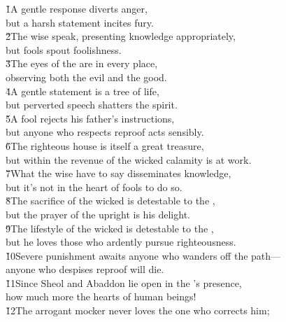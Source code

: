 \begin{poetry}
\poeml {}
\v{1}A gentle response diverts anger, \\
\poeml but a harsh statement incites fury. \\
\poeml \v{2}The wise speak, presenting knowledge appropriately, \\
\poemll    but fools spout foolishness. \\
\poeml \v{3}The eyes of the  are in every place, \\
\poemll    observing both the evil and the good. \\
\poeml \v{4}A gentle statement is a tree of life, \\
\poemll    but perverted speech shatters the spirit. \\
\poeml \v{5}A fool rejects his father's instructions, \\
\poemll    but anyone who respects reproof acts sensibly. \\
\poeml \v{6}The righteous house is itself a great treasure, \\
\poemll    but within the revenue of the wicked calamity is at work. \\
\poeml \v{7}What the wise have to say disseminates knowledge, \\
\poemll    but it's not in the heart of fools to do so. \\
\poeml \v{8}The sacrifice of the wicked is detestable to the , \\
\poemll    but the prayer of the upright is his delight. \\
\poeml \v{9}The lifestyle of the wicked is detestable to the , \\
\poemll    but he loves those who ardently pursue righteousness. \\
\poeml \v{10}Severe punishment awaits anyone who wanders off the path--- \\
\poemll    anyone who despises reproof will die. \\
\poeml \v{11}Since Sheol and Abaddon lie open in the 's presence, \\
\poemll    how much more the hearts of human beings! \\
\poeml \v{12}The arrogant mocker never loves the one who corrects him; \\

\end{poetry}
